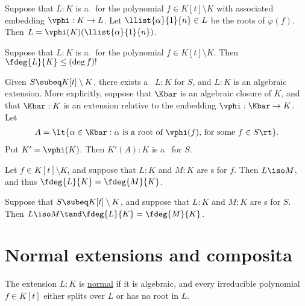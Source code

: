 \documentclass{article}
\begin{document}
  \begin{tproposition}
    Suppose that \( L:K \) is a \sfe~for the polynomial \( f\in K[t]\setminus K \) with associated embedding \( \vphi:K\to L \).
    Let \( \llist{\alpha}{1}{n}\in L \) be the roots of \( \varphi(f) \).
    Then \( L=\vphi(K)(\llist{\alpha}{1}{n}) \).
  \end{tproposition}

  \begin{tproposition}
    Suppose that \( L:K \) is a \sfe~for the polynomial \( f\in K[t]\setminus K \).
    Then \( \fdeg{L}{K}\leq (\deg f)! \)
  \end{tproposition}

  \begin{tproposition}
    Given \( S\subeq K[t]\setminus K \), there exists a \sfe~\( L:K \) for \( S \), and \( L:K \) is an algebraic extension.
    More explicitly, suppose that \( \Kbar \) is an algebraic closure of \( K \), and that \( \Kbar:K \) is an extension relative to the embedding \( \vphi:\Kbar\to K \).
    Let
    \begin{align*}
      A=\lt\{ \alpha\in \Kbar : \alpha\text{ is a root of \( \vphi(f) \), for some } f\in S \rt\}.
    \end{align*}
    Put \( K'=\vphi(K) \).
    Then \( K'(A):K \) is a \sfe~for \( S \).
  \end{tproposition}

  \begin{ttheorem}
    Let \( f\in K[t]\setminus K \), and suppose that \( L:K \) and \( M:K \) are \sfe s for \( f \).
    Then \( L\iso M \), and thus \( \fdeg{L}{K}=\fdeg{M}{K} \).
  \end{ttheorem}

  \begin{ttheorem}
    Suppose that \( S\subeq K[t]\setminus K \), and suppose that \( L:K \) and \( M:K \) are \sfe s for \( S \).
    Then \( L\iso M\tand \fdeg{L}{K}=\fdeg{M}{K} \).
  \end{ttheorem}

\section{Normal extensions and composita}
  \begin{tdefinition}
    The extension \( L:K \) is \ul{normal} if it is algebraic, and every irreducible polynomial \( f\in K[t] \) either splits over \( L \) or has no root in \( L \).
  \end{tdefinition}
\end{document}
